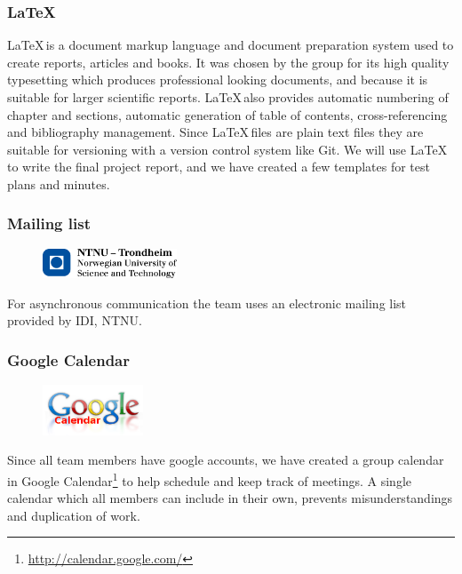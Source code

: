 \subsubsection{\LaTeX}
\LaTeX \,is a document markup language and document preparation system used to
create reports, articles and books. It was chosen by the group for its 
high quality typesetting which produces professional looking documents, and 
because it is suitable for larger scientific reports. \LaTeX \,also provides
automatic numbering of chapter and sections, automatic generation of table of
contents, cross-referencing and bibliography management. Since \LaTeX \,files
are plain text files they are suitable for versioning with a version control
system like Git. We will use \LaTeX \,to write the final project report, and we
have created a few templates for test plans and minutes.

\subsubsection{Mailing list}
\begin{figure}
	\vspace{-20pt}
	\includegraphics[width=4cm]{./planning/img/ntnu_logo}
	\vspace{-20pt}
\end{figure}
For asynchronous communication the team uses an electronic mailing list
provided by IDI, NTNU.

\subsubsection{Google Calendar}
\begin{figure}
	\vspace{-20pt}
	\includegraphics[width=3cm]{./planning/img/google_calendar_logo}
	\vspace{-20pt}
\end{figure}
Since all team members have google accounts, we have created a group calendar
in Google Calendar\footnote{\url{http://calendar.google.com/}}
to help schedule and keep track of meetings. A single calendar which all
members can include in their own, prevents misunderstandings and duplication
of work.

